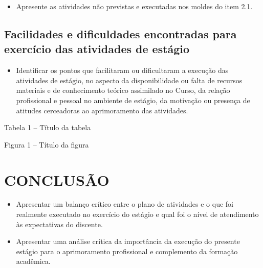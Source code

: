 \documentclass[12pt]{article}
\begin{document}
{\color{red}
\begin{justify}
    \begin{itemize}
        \item Apresente as atividades não previstas e executadas nos moldes do item 2.1.

    \end{itemize}
\end{justify}
}

\subsection{Facilidades e dificuldades encontradas para exercício das atividades de estágio}

{\color{red}
\begin{justify}
    \begin{itemize}
        \item Identificar os pontos que facilitaram ou dificultaram a execução das atividades de estágio, no aspecto da disponibilidade ou falta de recursos materiais e de conhecimento teórico assimilado no Curso, da relação profissional e pessoal no ambiente de estágio, da motivação ou presença de atitudes cerceadoras ao aprimoramento das atividades.

    \end{itemize}
\end{justify}
}

{\color{red}
\begin{center}

Tabela 1 – Título da tabela

\vspace{2em}

Figura 1 – Título da figura

\end{center}
}

\section{CONCLUSÃO}

{\color{red}
\begin{justify}
    \begin{itemize}
        \item Apresentar um balanço crítico entre o plano de atividades e o que foi realmente executado no exercício do estágio e qual foi o nível de atendimento às expectativas do discente.
        
        \item Apresentar uma análise crítica da importância da execução do presente estágio para o aprimoramento profissional e complemento da formação acadêmica.

    \end{itemize}
\end{justify}
}
\end{document}
